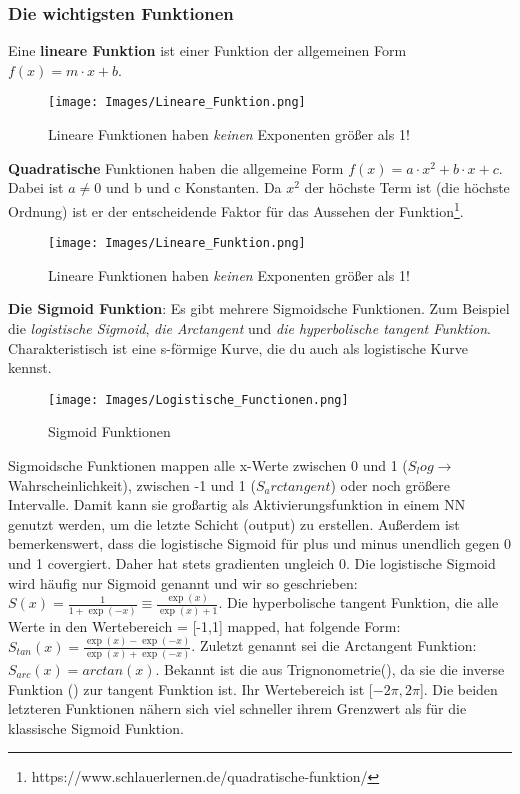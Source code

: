 \documentclass{scrreprt}
\begin{document}
\subsubsection{Die wichtigsten Funktionen}\label{Die wichtigsten Funktionen}
Eine \textbf{lineare Funktion} ist einer Funktion der allgemeinen Form $f(x)=m\cdot x +b$.
\begin{wrapfigure}{R}{0.5\textwidth}
    \texttt{[image: Images/Lineare\_Funktion.png]}
    \caption{Lineare Funktionen haben \textit{keinen} Exponenten größer als 1!}
\end{wrapfigure}
\textbf{Quadratische} Funktionen haben die allgemeine Form $f(x)=a\cdot x^2+b\cdot x+c$. Dabei ist $a \neq 0$ und b und c Konstanten. Da $x^2$ der höchste Term ist (die höchste Ordnung) ist er der entscheidende Faktor für das Aussehen der Funktion\footnote{https://www.schlauerlernen.de/quadratische-funktion/}.
\begin{wrapfigure}{R}{0.5\textwidth}
    \texttt{[image: Images/Lineare\_Funktion.png]}
    \caption{Lineare Funktionen haben \textit{keinen} Exponenten größer als 1!}
\end{wrapfigure}
\textbf{Die Sigmoid Funktion}: Es gibt mehrere Sigmoidsche Funktionen. Zum Beispiel die \textit{logistische Sigmoid}, \textit{die Arctangent} und \textit{die hyperbolische tangent Funktion}. Charakteristisch ist eine s-förmige Kurve, die du auch als logistische Kurve kennst.
\begin{wrapfigure}{R}{0.5\textwidth}
    \texttt{[image: Images/Logistische\_Functionen.png]}
    \caption{Sigmoid Funktionen}
\end{wrapfigure}
Sigmoidsche Funktionen mappen alle x-Werte zwischen 0 und 1 ($S_log \rightarrow$ Wahrscheinlichkeit), zwischen -1 und 1 ($S_arctangent$) oder noch größere Intervalle. Damit kann sie großartig als Aktivierungsfunktion in einem NN genutzt werden, um die letzte Schicht (output) zu erstellen. Außerdem ist bemerkenswert, dass die logistische Sigmoid für plus und minus unendlich gegen 0 und 1 covergiert. Daher hat stets gradienten ungleich 0. Die logistische Sigmoid wird häufig nur Sigmoid genannt und wir so geschrieben: $S(x)=\frac{1}{1+\exp(-x)} \equiv \frac{\exp(x)}{\exp(x)+1}$. Die hyperbolische tangent Funktion, die alle Werte in den Wertebereich = [-1,1] mapped, hat folgende Form: $S_{tan}(x)=\frac{\exp(x)-\exp(-x)}{\exp(x)+\exp(-x)}$. Zuletzt genannt sei die Arctangent Funktion: $S_{arc}(x)=arctan(x)$. Bekannt ist die aus Trignonometrie(), da sie die inverse Funktion () zur tangent Funktion ist. Ihr Wertebereich ist [$-2 \pi, 2 \pi$]. Die beiden letzteren Funktionen nähern sich viel schneller ihrem Grenzwert als für die klassische Sigmoid Funktion.
\end{document}
